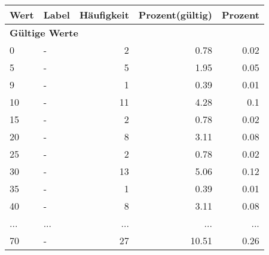      \begin{longtable}{lXrrr}
     \toprule
     \textbf{Wert} & \textbf{Label} & \textbf{Häufigkeit} & \textbf{Prozent(gültig)} & \textbf{Prozent} \\
     \endhead
     \midrule
     \multicolumn{5}{l}{\textbf{Gültige Werte}}\\
        0 & \multicolumn{1}{X}{-} & %
          \num{2} &
          \num[round-mode=places,round-precision=2]{0.78} &
          \num[round-mode=places,round-precision=2]{0.02} \\
        5 & \multicolumn{1}{X}{-} & %
          \num{5} &
          \num[round-mode=places,round-precision=2]{1.95} &
          \num[round-mode=places,round-precision=2]{0.05} \\
        9 & \multicolumn{1}{X}{-} & %
          \num{1} &
          \num[round-mode=places,round-precision=2]{0.39} &
          \num[round-mode=places,round-precision=2]{0.01} \\
        10 & \multicolumn{1}{X}{-} & %
          \num{11} &
          \num[round-mode=places,round-precision=2]{4.28} &
          \num[round-mode=places,round-precision=2]{0.1} \\
        15 & \multicolumn{1}{X}{-} & %
          \num{2} &
          \num[round-mode=places,round-precision=2]{0.78} &
          \num[round-mode=places,round-precision=2]{0.02} \\
        20 & \multicolumn{1}{X}{-} & %
          \num{8} &
          \num[round-mode=places,round-precision=2]{3.11} &
          \num[round-mode=places,round-precision=2]{0.08} \\
        25 & \multicolumn{1}{X}{-} & %
          \num{2} &
          \num[round-mode=places,round-precision=2]{0.78} &
          \num[round-mode=places,round-precision=2]{0.02} \\
        30 & \multicolumn{1}{X}{-} & %
          \num{13} &
          \num[round-mode=places,round-precision=2]{5.06} &
          \num[round-mode=places,round-precision=2]{0.12} \\
        35 & \multicolumn{1}{X}{-} & %
          \num{1} &
          \num[round-mode=places,round-precision=2]{0.39} &
          \num[round-mode=places,round-precision=2]{0.01} \\
        40 & \multicolumn{1}{X}{-} & %
          \num{8} &
          \num[round-mode=places,round-precision=2]{3.11} &
          \num[round-mode=places,round-precision=2]{0.08} \\
       ... & ... & ... & ... & ... \\
        70 & \multicolumn{1}{X}{-} & %
          \num{27} &
          \num[round-mode=places,round-precision=2]{10.51} &
          \num[round-mode=places,round-precision=2]{0.26} \\


\end{longtable}

